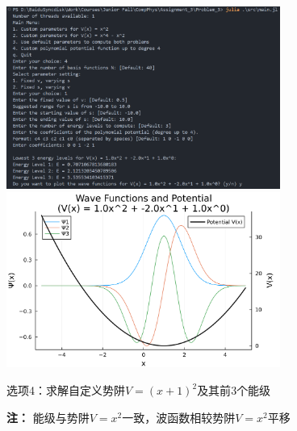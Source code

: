 \begin{figure}[H]
	\centering
	\includegraphics[width=0.8\textwidth]{Problem_3/figs/choice_4_2.png}
    \hspace{5pt}
    \includegraphics[width=0.8\textwidth]{Problem_3/figs/plot_4.png}
	\caption{选项4：求解自定义势阱$V=(x+1)^2$及其前$3$个能级}
	\caption*{\footnotesize{\textbf{注：} 能级与势阱$V=x^2$一致，波函数相较势阱$V=x^2$平移}}
\end{figure}

